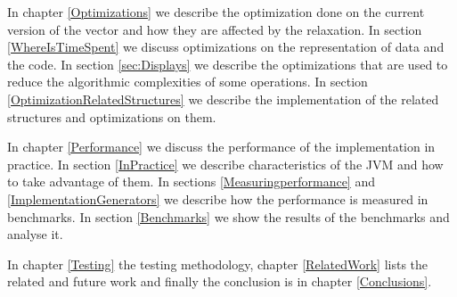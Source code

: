 In chapter \ref{Optimizations} we describe the optimization done on the current version of the vector and how they are affected by the relaxation. In section \ref{WhereIsTimeSpent} we discuss optimizations on the representation of data and the code. In section \ref{sec:Displays} we describe the optimizations that are used to reduce the algorithmic complexities of some operations. In section \ref{OptimizationRelatedStructures} we describe the implementation of the related structures and optimizations on them.

In chapter \ref{Performance} we discuss the performance of the implementation in practice. In section \ref{InPractice} we describe characteristics of the JVM and how to take advantage of them. In sections \ref{Measuringperformance} and \ref{ImplementationGenerators} we describe how the performance is measured in benchmarks. In section \ref{Benchmarks} we show  the results of the benchmarks and analyse it.

In chapter \ref{Testing} the testing methodology, chapter \ref{RelatedWork} lists the related and future work and finally the conclusion is in chapter \ref{Conclusions}.




